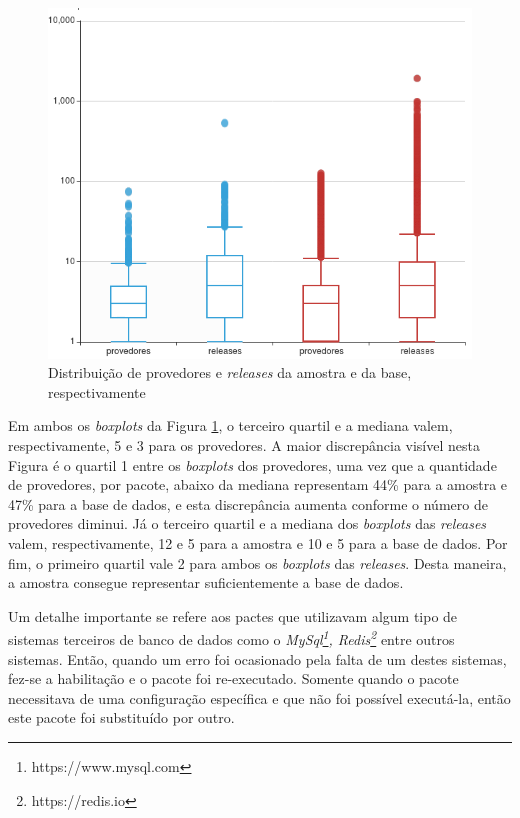 \begin{figure}
    \centering
    \includegraphics[scale=0.6]{figuras/data_box_plot_pt.png}
    \caption{Distribuição de provedores e \textit{releases} da amostra e da base, respectivamente}
    \label{fig:database}
\end{figure}{}

Em ambos os \textit{boxplots} da Figura \ref{fig:database}, o terceiro quartil e a mediana valem, respectivamente, 5 e 3 para os provedores. A maior discrepância visível nesta Figura é o quartil 1 entre os \textit{boxplots} dos provedores, uma vez que a quantidade de provedores, por pacote, abaixo da mediana representam 44\% para a amostra e 47\% para a base de dados, e esta discrepância aumenta conforme o número de provedores diminui. Já o terceiro quartil e a mediana dos \textit{boxplots} das \textit{releases} valem, respectivamente, 12 e 5 para a amostra e 10 e 5 para a base de dados. Por fim, o primeiro quartil vale 2 para ambos os \textit{boxplots} das \textit{releases}. Desta maneira, a amostra consegue representar suficientemente a base de dados.

Um detalhe importante se refere aos pactes que utilizavam algum tipo de sistemas terceiros de banco de dados como o \textit{MySql\footnote{https://www.mysql.com}, Redis\footnote{https://redis.io}} entre outros sistemas. Então, quando um erro foi ocasionado pela falta de um destes sistemas, fez-se a habilitação e o pacote foi re-executado. Somente quando o pacote necessitava de uma configuração específica e que não foi possível executá-la, então este pacote foi substituído por outro.

